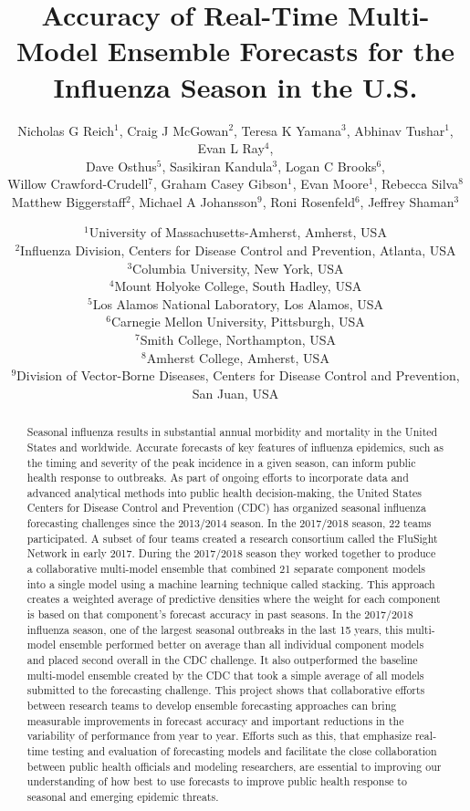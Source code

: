\documentclass{article}\usepackage[]{graphicx}\usepackage[]{color}
\title{Accuracy of Real-Time Multi-Model Ensemble Forecasts for the Influenza Season in the U.S.}
\author{Nicholas G Reich$^1$, Craig J McGowan$^2$, Teresa K Yamana$^3$, Abhinav Tushar$^1$, Evan L Ray$^4$,\\
Dave Osthus$^5$, Sasikiran Kandula$^3$, Logan C Brooks$^6$,\\
Willow Crawford-Crudell$^7$, Graham Casey Gibson$^1$, Evan Moore$^1$, Rebecca Silva$^8$\\Matthew Biggerstaff$^2$, Michael A Johansson$^9$, Roni Rosenfeld$^6$, Jeffrey Shaman$^3$}
\date{%
    $^1$University of Massachusetts-Amherst, Amherst, USA\\%
    $^2$Influenza Division, Centers for Disease Control and Prevention, Atlanta, USA\\
    $^3$Columbia University, New York, USA\\
    $^4$Mount Holyoke College, South Hadley, USA\\
    $^5$Los Alamos National Laboratory, Los Alamos, USA\\
    $^6$Carnegie Mellon University, Pittsburgh, USA\\%
    $^7$Smith College, Northampton, USA\\
    $^8$Amherst College, Amherst, USA\\
    $^9$Division of Vector-Borne Diseases, Centers for Disease Control and Prevention, San Juan, USA\\
}
\begin{document}

\maketitle











\begin{abstract}
Seasonal influenza results in substantial annual morbidity and mortality in the United States and worldwide.
Accurate forecasts of key features of influenza epidemics, such as the timing and severity of the peak incidence in a given season, can inform public health response to outbreaks.
As part of ongoing efforts to incorporate data and advanced analytical methods into public health decision-making, the United States Centers for Disease Control and Prevention (CDC) has organized seasonal influenza forecasting challenges since the 2013/2014 season. 
In the 2017/2018 season, 22 teams participated. 
A subset of four teams created a research consortium called the FluSight Network in early 2017.
During the 2017/2018 season they worked together to produce a collaborative multi-model ensemble that combined 21 separate component models into a single model using a machine learning technique called stacking.
This approach creates a weighted average of predictive densities where the weight for each component is based on that component's forecast accuracy in past seasons.
In the 2017/2018 influenza season, one of the largest seasonal outbreaks in the last 15 years, this multi-model ensemble performed better on average than all individual component models and placed second overall in the CDC challenge.
It also outperformed the baseline multi-model ensemble created by the CDC that took a simple average of all models submitted to the forecasting challenge.
This project shows that collaborative efforts between research teams to develop ensemble forecasting approaches can bring measurable improvements in forecast accuracy and important reductions in the variability of performance from year to year.
Efforts such as this, that emphasize real-time testing and evaluation of forecasting models and facilitate the close collaboration between public health officials and modeling researchers, are essential to improving our understanding of how best to use forecasts to improve public health response to seasonal and emerging epidemic threats.
\end{abstract}
\end{document}
